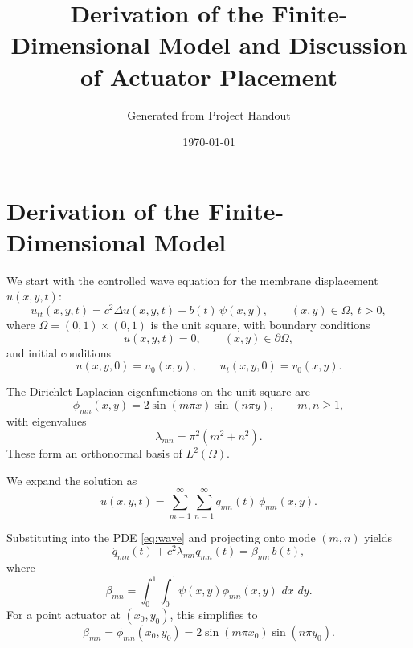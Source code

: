 \documentclass[11pt]{article}
\title{Derivation of the Finite-Dimensional Model and Discussion of Actuator Placement}
\author{Generated from Project Handout}
\date{\today}
\newcommand{\dd}{\,d}
\begin{document}

\section{Derivation of the Finite-Dimensional Model}

We start with the controlled wave equation for the membrane displacement $u(x,y,t)$:
\begin{equation}
\label{eq:wave}
 u_{tt}(x,y,t) = c^2 \Delta u(x,y,t) + b(t)\,\psi(x,y), 
 \qquad (x,y)\in\Omega,\ t>0,
\end{equation}
where $\Omega = (0,1)\times(0,1)$ is the unit square, with boundary conditions
\begin{equation}
\label{eq:bc}
 u(x,y,t)=0,\qquad (x,y)\in \partial\Omega,
\end{equation}
and initial conditions
\begin{equation}
\label{eq:ic}
 u(x,y,0)=u_0(x,y),\qquad u_t(x,y,0)=v_0(x,y).
\end{equation}

The Dirichlet Laplacian eigenfunctions on the unit square are
\begin{equation}
\label{eq:eigs}
\phi_{mn}(x,y)=2\sin(m\pi x)\sin(n\pi y),\qquad m,n\ge 1,
\end{equation}
with eigenvalues
\begin{equation}
\label{eq:eigvals}
\lambda_{mn}=\pi^2(m^2+n^2).
\end{equation}
These form an orthonormal basis of $L^2(\Omega)$.

We expand the solution as
\begin{equation}
\label{eq:expansion}
 u(x,y,t)=\sum_{m=1}^{\infty}\sum_{n=1}^{\infty} q_{mn}(t)\,\phi_{mn}(x,y).
\end{equation}

Substituting into the PDE \eqref{eq:wave} and projecting onto mode $(m,n)$ yields
\begin{equation}
\label{eq:modalode}
 \ddot q_{mn}(t) + c^2\lambda_{mn} q_{mn}(t) = \beta_{mn}\, b(t),
\end{equation}
where
\begin{equation}
\label{eq:beta-general}
\beta_{mn}=\int_0^1\!\int_0^1 \psi(x,y)\phi_{mn}(x,y)\,\dd x\,\dd y.
\end{equation}
For a point actuator at $(x_0,y_0)$, this simplifies to
\begin{equation}
\label{eq:beta-point}
\beta_{mn}=\phi_{mn}(x_0,y_0)=2\sin(m\pi x_0)\sin(n\pi y_0).
\end{equation}
\end{document}
